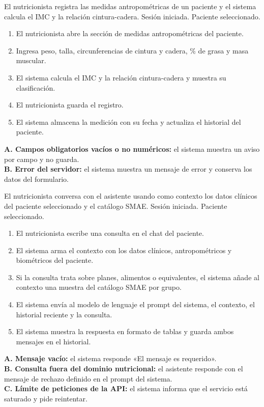 {\small
{}
{El nutricionista registra las medidas antropométricas de un paciente y el sistema calcula el IMC y la relación cintura-cadera.}
{Sesión iniciada. Paciente seleccionado.}
{\begin{enumerate}[nosep]
 \item El nutricionista abre la sección de medidas antropométricas del paciente.
 \item Ingresa peso, talla, circunferencias de cintura y cadera, \% de grasa y masa muscular.
 \item El sistema calcula el IMC y la relación cintura-cadera y muestra su clasificación.
 \item El nutricionista guarda el registro.
 \item El sistema almacena la medición con su fecha y actualiza el historial del paciente.
\end{enumerate}}
{\textbf{A. Campos obligatorios vacíos o no numéricos:} el sistema muestra un aviso por campo y no guarda.\\
 \textbf{B. Error del servidor:} el sistema muestra un mensaje de error y conserva los datos del formulario.}

{El nutricionista conversa con el asistente usando como contexto los datos clínicos del paciente seleccionado y el catálogo SMAE.}
{Sesión iniciada. Paciente seleccionado.}
{\begin{enumerate}[nosep]
 \item El nutricionista escribe una consulta en el chat del paciente.
 \item El sistema arma el contexto con los datos clínicos, antropométricos y biométricos del paciente.
 \item Si la consulta trata sobre planes, alimentos o equivalentes, el sistema añade al contexto una muestra del catálogo SMAE por grupo.
 \item El sistema envía al modelo de lenguaje el prompt del sistema, el contexto, el historial reciente y la consulta.
 \item El sistema muestra la respuesta en formato de tablas y guarda ambos mensajes en el historial.
\end{enumerate}}
{\textbf{A. Mensaje vacío:} el sistema responde «El mensaje es requerido».\\
 \textbf{B. Consulta fuera del dominio nutricional:} el asistente responde con el mensaje de rechazo definido en el prompt del sistema.\\
 \textbf{C. Límite de peticiones de la API:} el sistema informa que el servicio está saturado y pide reintentar.}

}
